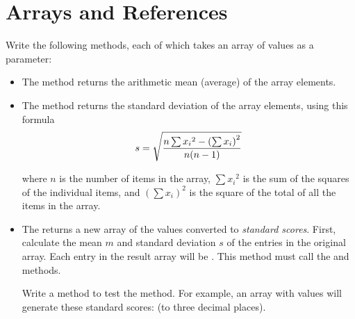 \chapter{Arrays and References}


\begin{exercise}
Write the following methods, each of which takes an array of  values as a parameter:

\begin{itemize}
\item The  method returns the arithmetic mean (average) of the array elements.

\item The  method returns the standard deviation of the array elements, using this formula
\begin{equation*}
s = \sqrt {{n \sum{x_i} ^2 - \left(\sum{x_i}\right)^2} \over {n (n - 1)}}
\end{equation*}

where $n$ is the number of items in the array, $\sum{x_i} ^2$ is the sum of the squares of the individual items, and $\left(\sum{x_i}\right)^2$ is the square of the total of all the items in the array.

\item The  returns a new array of the values converted to {\em standard scores}. First, calculate the mean $m$ and standard deviation $s$ of the entries in the original array. Each entry in the result array will be . This method must call the  and  methods.

Write a  method to test the  method. For example, an array with values
 will generate these standard scores:  (to three decimal places). 

\end{itemize}
\end{exercise}


